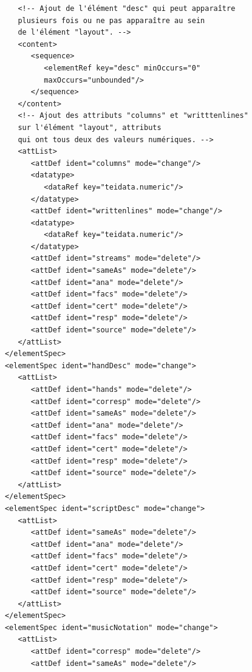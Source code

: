 \documentclass[a4paper,12pt,twoside]{book}
\begin{document}
\begin{verbatim}
               <!-- Ajout de l'élément "desc" qui peut apparaître 
               plusieurs fois ou ne pas apparaître au sein 
               de l'élément "layout". -->
               <content>
                  <sequence>
                     <elementRef key="desc" minOccurs="0" 
                     maxOccurs="unbounded"/>
                  </sequence>
               </content>
               <!-- Ajout des attributs "columns" et "writttenlines" 
               sur l'élément "layout", attributs 
               qui ont tous deux des valeurs numériques. -->
               <attList>
                  <attDef ident="columns" mode="change"/>
                  <datatype>
                     <dataRef key="teidata.numeric"/>
                  </datatype>
                  <attDef ident="writtenlines" mode="change"/>
                  <datatype>
                     <dataRef key="teidata.numeric"/>
                  </datatype>
                  <attDef ident="streams" mode="delete"/>
                  <attDef ident="sameAs" mode="delete"/>
                  <attDef ident="ana" mode="delete"/>
                  <attDef ident="facs" mode="delete"/>
                  <attDef ident="cert" mode="delete"/>
                  <attDef ident="resp" mode="delete"/>
                  <attDef ident="source" mode="delete"/>
               </attList>
            </elementSpec>
            <elementSpec ident="handDesc" mode="change">
               <attList>
                  <attDef ident="hands" mode="delete"/>
                  <attDef ident="corresp" mode="delete"/>
                  <attDef ident="sameAs" mode="delete"/>
                  <attDef ident="ana" mode="delete"/>
                  <attDef ident="facs" mode="delete"/>
                  <attDef ident="cert" mode="delete"/>
                  <attDef ident="resp" mode="delete"/>
                  <attDef ident="source" mode="delete"/>
               </attList>
            </elementSpec>
            <elementSpec ident="scriptDesc" mode="change">
               <attList>
                  <attDef ident="sameAs" mode="delete"/>
                  <attDef ident="ana" mode="delete"/>
                  <attDef ident="facs" mode="delete"/>
                  <attDef ident="cert" mode="delete"/>
                  <attDef ident="resp" mode="delete"/>
                  <attDef ident="source" mode="delete"/>
               </attList>
            </elementSpec>
            <elementSpec ident="musicNotation" mode="change">
               <attList>
                  <attDef ident="corresp" mode="delete"/>
                  <attDef ident="sameAs" mode="delete"/>

\end{verbatim}
\end{document}
